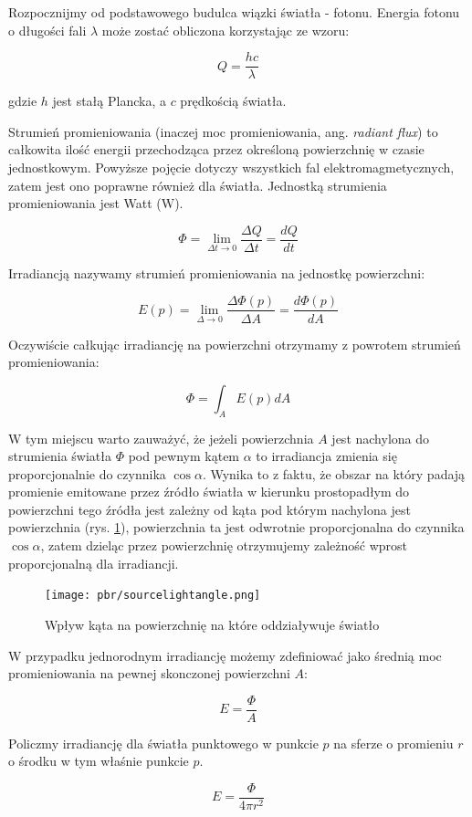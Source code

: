 \documentclass[../main.tex]{subfiles}
\begin{document}
Rozpocznijmy od podstawowego budulca wiązki światła - fotonu. Energia fotonu
o długości fali $\lambda$ może zostać obliczona korzystając ze wzoru:

$$ Q = \frac{hc}{\lambda} $$

\noindent gdzie $h$ jest stałą Plancka, a $c$ prędkością światła.

Strumień promieniowania (inaczej moc promieniowania, ang. \textit{radiant
flux}) to całkowita ilość energii przechodząca przez określoną powierzchnię w
czasie jednostkowym. Powyższe pojęcie dotyczy wszystkich fal
elektromagmetycznych, zatem jest ono poprawne również dla światła. Jednostką
strumienia promieniowania jest Watt ($\text{W}$).

$$
\Phi = \lim_{\Delta t \rightarrow 0}{
    \frac{\Delta Q}{\Delta t}=\frac{dQ}{dt}
}
$$

Irradiancją nazywamy strumień promieniowania na jednostkę powierzchni:

$$
E(p) =
    \lim_{\Delta \rightarrow 0} {
        \frac{\Delta \Phi(p)}{\Delta A}
    } =
    \frac{d\Phi(p)}{dA}
$$

Oczywiście całkując irradiancję na powierzchni otrzymamy z powrotem strumień
promieniowania:

$$
\Phi = \int_{A} {
    E(p)
    dA
}
$$

W tym miejscu warto zauważyć, że jeżeli powierzchnia $A$ jest nachylona do
strumienia światła $\Phi$ pod pewnym kątem $\alpha$ to irradiancja zmienia się
proporcjonalnie do czynnika $\cos \alpha$. Wynika to z faktu, że obszar na
który padają promienie emitowane przez źródło światła w kierunku prostopadłym
do powierzchni tego źródła jest zależny od kąta pod którym nachylona jest
powierzchnia (rys. \ref{fig:SourceLightAngle}), powierzchnia ta jest odwrotnie
proporcjonalna do czynnika $\cos \alpha$, zatem dzieląc przez powierzchnię
otrzymujemy zależność wprost proporcjonalną dla irradiancji.

\begin{figure}[ht]
  \centering
  \texttt{[image: pbr/sourcelightangle.png]}
  \caption{Wpływ kąta na powierzchnię na które oddziaływuje światło}
  \label{fig:SourceLightAngle}
\end{figure}

W przypadku jednorodnym irradiancję możemy zdefiniować jako średnią moc
promieniowania na pewnej skonczonej powierzchni $A$:

$$
E = \frac{\Phi}{A}
$$

\begin{example}
  Policzmy irradiancję dla światła punktowego w punkcie $p$ na sferze o
  promieniu $r$ o środku w tym właśnie punkcie $p$.

  \[
    E = \frac{\Phi}{4 \pi r^2}
  \]
\end{example}
\end{document}
